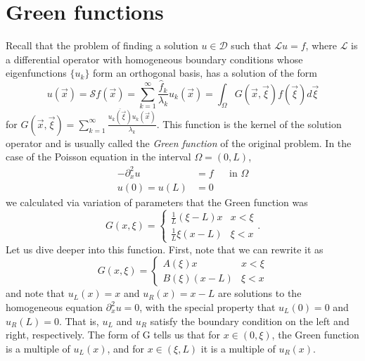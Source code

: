 \section{Green functions}\label{sec:green-functions}
Recall that the problem of finding a solution $u\in\mathcal{D}$ such that $\mathcal{L}u=f$, where $\mathcal{L}$ is a differential operator with homogeneous boundary conditions whose eigenfunctions $\{u_k\}$ form an orthogonal basis, has a solution of the form
\begin{equation}
    u(\vec{x})=\mathcal{S}f(\vec{x})=\sum_{k=1}^{\infty}\frac{\hat{f}_{k}}{\lambda_{k}}u_{k}(\vec{x})=\int_{\Omega}G(\vec{x},\vec{\xi})f(\vec{\xi})d\vec{\xi}
\end{equation}
for $G(\vec{x},\vec{\xi})=\sum_{k=1}^{\infty}\frac{\overline{u_{k}(\vec{\xi})}u_{k}(\vec{x})}{\lambda_{k}}$.  This function is the kernel of the solution operator and is usually called the \textit{Green function} of the original problem. In the case of the Poisson equation in the interval $\Omega = (0,L)$,
\begin{equation}
    \begin{aligned}
        -\partial_{x}^{2}u&=f&&\text{in }\Omega\\ 
        u(0)=u(L)&=0
    \end{aligned}
\end{equation}
we calculated via variation of parameters that the Green function was
\begin{equation}
    G(x,\xi)=\begin{cases}\frac{1}{L}(\xi-L)x&x<\xi\\ \frac{1}{L}\xi(x-L)&\xi<x\end{cases}.
\end{equation}
Let us dive deeper into this function. First, note that we can rewrite it as 
\begin{equation}
    G(x,\xi)=\begin{cases}A(\xi)x&x<\xi\\ B(\xi)(x-L)&\xi<x\end{cases}
\end{equation}
and note that $u_{L}(x)=x$ and $u_{R}(x)=x-L$ are solutions to the homogeneous equation $\partial_{x}^{2}u=0$, with the special property that $u_{L}(0)=0$ and $u_{R}(L)=0$. That is, $u_L$ and $u_R$ satisfy the boundary condition on the left and right, respectively. The form of G tells us that for $x \in (0,\xi)$, the Green function is a multiple of $u_L(x)$, and for $x \in (\xi,L)$ it is a multiple of $u_R(x)$. 

